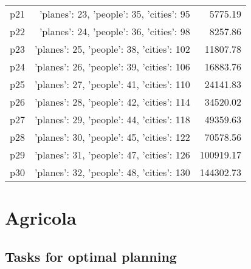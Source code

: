 \documentclass{article}
\begin{document}
\begin{center}
\begin{tabular}{@{}l|r|r@{}}
  p21&{'planes': 23, 'people': 35, 'cities': 95}&5775.19\\
  p22&{'planes': 24, 'people': 36, 'cities': 98}&8257.86\\
  p23&{'planes': 25, 'people': 38, 'cities': 102}&11807.78\\
  p24&{'planes': 26, 'people': 39, 'cities': 106}&16883.76\\
  p25&{'planes': 27, 'people': 41, 'cities': 110}&24141.83\\
  p26&{'planes': 28, 'people': 42, 'cities': 114}&34520.02\\
  p27&{'planes': 29, 'people': 44, 'cities': 118}&49359.63\\
  p28&{'planes': 30, 'people': 45, 'cities': 122}&70578.56\\
  p29&{'planes': 31, 'people': 47, 'cities': 126}&100919.17\\
  p30&{'planes': 32, 'people': 48, 'cities': 130}&144302.73
                            \end{tabular}
                            \end{center}
                    
                            \newpage \section{Agricola}
                    \subsection*{Tasks for optimal planning}
                    
\end{document}
